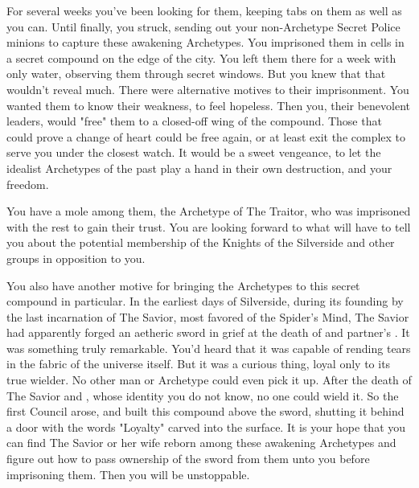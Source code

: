 \documentclass[blue]{Silversiders}
\begin{document}
For several weeks you've been looking for them, keeping tabs on them as well as you can. Until finally, you struck, sending out your non-Archetype Secret Police minions to capture these awakening Archetypes. You imprisoned them in cells in a secret compound on the edge of the city. You left them there for a week with only water, observing them through secret windows. But you knew that that wouldn't reveal much. There were alternative motives to their imprisonment. You wanted them to know their weakness, to feel hopeless. Then you, their benevolent leaders, would "free" them to a closed-off wing of the compound. Those that could prove a change of heart could be free again, or at least exit the complex to serve you under the closest watch. It would be a sweet vengeance, to let the idealist Archetypes of the past play a hand in their own destruction, and your freedom.

You have a mole among them, the Archetype of The Traitor, who was imprisoned with the rest to gain their trust. You are looking forward to what \cTraitor{\they} will have to tell you about the potential membership of the Knights of the Silverside and other groups in opposition to you.

You also have another motive for bringing the Archetypes to this secret compound in particular. In the earliest days of Silverside, during its founding by the last incarnation of The Savior, most favored of the Spider's Mind, The Savior had apparently forged an aetheric sword in \cSavior{\their} grief at the death of \cSavior{\their} and \cSavior{\their} partner's \cLoyalty{\offspring}. It was something truly remarkable. You'd heard that it was capable of rending tears in the fabric of the universe itself. But it was a curious thing, loyal only to its true wielder. No other man or Archetype could even pick it up. After the death of The Savior and \cSavior{\their} \cIngenuityOld{\spouse}, whose identity you do not know, no one could wield it. So the first Council arose, and built this compound above the sword, shutting it behind a door with the words "Loyalty" carved into the surface. It is your hope that you can find The Savior or her wife reborn among these awakening Archetypes and figure out how to pass ownership of the sword from them unto you before imprisoning them. Then you will be unstoppable.
\end{document}
